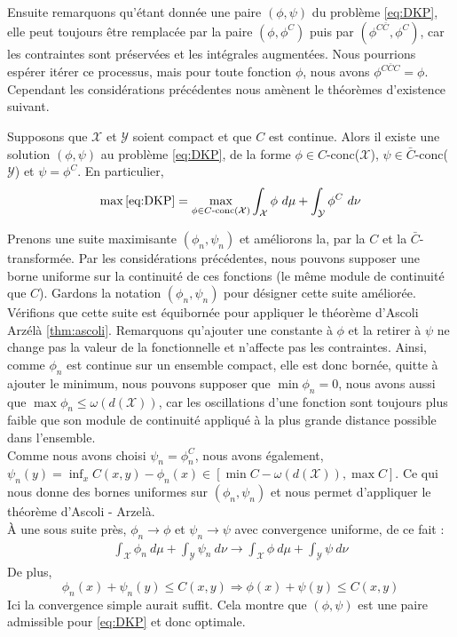 \documentclass[a4paper,12pt]{article}
\begin{document}
Ensuite remarquons qu'étant donnée une paire $(\phi,\psi)$ du problème \eqref{eq:DKP}, elle peut toujours être remplacée par la paire $(\phi,\phi^C)$ puis par $(\phi^{C\bar{C}},\phi^C)$, car les contraintes sont préservées et les intégrales augmentées. 
Nous pourrions espérer itérer ce processus, mais pour toute fonction $\phi$, nous avons $\phi^{C\bar{C}C} = \phi$. Cependant les considérations précédentes nous amènent le théorèmes d'existence suivant. 
\begin{theoreme}{}
\label{thm:existDKP}
Supposons que $\mathcal{X}$ et $\mathcal{Y}$ soient compact et que $C$ est continue. Alors il existe une solution $(\phi,\psi)$ au problème \eqref{eq:DKP}, de la forme $\phi\in C$-conc($\mathcal{X}$), $\psi\in \bar{C}$-conc($\mathcal{Y}$) et $\psi=\phi^C$. En particulier, 
\begin{align}
\max\eqref{eq:DKP} = \max_{\phi\in C\text{-conc}(\mathcal{X})}\int_{\mathcal{X}}\phi\ d\mu +\int_{\mathcal{Y}} \phi^C\ d\nu
\label{eq:existenceDKP}
\end{align}
\end{theoreme}
\begin{preuve}
Prenons une suite maximisante $(\phi_n,\psi_n)$ et améliorons la, par la $C$ et la $\bar{C}$-transformée. Par les considérations précédentes, nous pouvons supposer une borne uniforme sur la continuité de ces fonctions (le même module de continuité que $C$). Gardons la notation $(\phi_n,\psi_n)$  pour désigner cette suite améliorée. \\
Vérifions que cette suite est équibornée pour appliquer le théorème d'Ascoli Arzélà \eqref{thm:ascoli}. Remarquons qu'ajouter une constante à $\phi$ et la retirer à $\psi$ ne change pas la valeur de la fonctionnelle et n'affecte pas les contraintes. Ainsi, comme $\phi_n$ est continue sur un ensemble compact, elle est donc bornée, quitte à ajouter le minimum, nous pouvons supposer que $\min \phi_n=0$, nous avons aussi que $\max \phi_n \leq \omega (d(\mathcal{X}))$, car les oscillations d'une fonction sont toujours plus faible que son module de continuité appliqué à la plus grande distance possible dans l'ensemble.\\
Comme nous avons choisi $\psi_n=\phi_n^C$, nous avons également, $\psi_n(y)=\inf_xC(x,y)-\phi_n(x)\in[\min C- \omega (d(\mathcal{X})),\max C]$. Ce qui nous donne des bornes uniformes sur $(\phi_n,\psi_n)$ et nous permet d'appliquer le théorème d'Ascoli - Arzelà.\\
\`A une sous suite près, $\phi_n\rightarrow\phi$ et $\psi_n\rightarrow\psi$ avec convergence uniforme, de ce fait : 
\begin{align}
\int_{\mathcal{X}}\phi_n\ d\mu + \int_{\mathcal{Y}}\psi_n\ d\nu \rightarrow \int_{\mathcal{X}}\phi\ d\mu + \int_{\mathcal{Y}}\psi\ d\nu
\end{align}
De plus, 
$$
\phi_n(x)+\psi_n(y)\leq C(x,y) \Rightarrow \phi(x)+\psi(y)\leq C(x,y)
$$
Ici la convergence simple aurait suffit. Cela montre que $(\phi,\psi)$ est une paire admissible pour \eqref{eq:DKP} et donc optimale.
\end{preuve}
\end{document}
